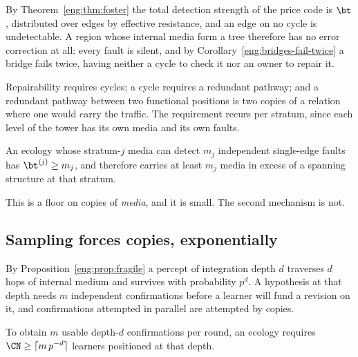 By Theorem~\ref{eng:thm:foster} the total detection strength of the price
code is $\bt$, distributed over edges by effective resistance, and an edge
on no cycle is undetectable. A region whose internal media form a tree
therefore has no error correction at all: every fault is silent, and by
Corollary~\ref{eng:bridges-fail-twice} a bridge fails twice, having
neither a cycle to check it nor an owner to repair it.

Repairability requires cycles; a cycle requires a redundant pathway; and a
redundant pathway between two functional positions is two copies of a
relation where one would carry the traffic. The requirement recurs per
stratum, since each level of the tower has its own media and its own
faults.

\begin{proposition}
\label{scm:prop:repairfloor}
An ecology whose stratum-$j$ media can detect $m_j$ independent
single-edge faults has $\bt^{(j)} \ge m_j$, and therefore carries at least
$m_j$ media in excess of a spanning structure at that stratum.
\end{proposition}

This is a floor on copies of \emph{media}, and it is small. The second
mechanism is not.

\subsection{Sampling forces copies, exponentially}

By Proposition~\ref{eng:prop:fragile} a percept of integration depth $d$
traverses $d$ hops of internal medium and survives with probability
$p^{d}$. A hypothesis at that depth needs $m$ independent confirmations
before a learner will fund a revision on it, and confirmations attempted
in parallel are attempted by copies.

\begin{proposition}
\label{scm:prop:sampfloor}
To obtain $m$ usable depth-$d$ confirmations per round, an ecology
requires $\CN \ge \lceil m\, p^{-d} \rceil$ learners positioned at that
depth.
\end{proposition}

